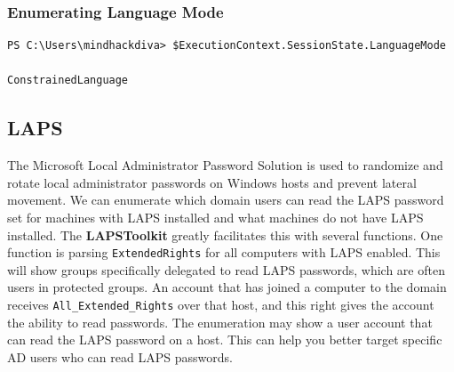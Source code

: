 \subsubsection{Enumerating Language Mode}
\begin{notebox}
\begin{verbatim}
PS C:\Users\mindhackdiva> $ExecutionContext.SessionState.LanguageMode

ConstrainedLanguage
\end{verbatim}
\end{notebox}

\subsection{LAPS}
The Microsoft Local Administrator Password Solution is used to randomize and rotate local administrator passwords on Windows hosts and prevent lateral movement. We can enumerate which domain users can read the LAPS password set for machines with LAPS installed and what machines do not have LAPS installed. The \textbf{LAPSToolkit} greatly facilitates this with several functions. One function is parsing \texttt{ExtendedRights} for all computers with LAPS enabled. This will show groups specifically delegated to read LAPS passwords, which are often users in protected groups. An account that has joined a computer to the domain receives \texttt{All_Extended_Rights} over that host, and this right gives the account the ability to read passwords. The enumeration may show a user account that can read the LAPS password on a host. This can help you better target specific AD users who can read LAPS passwords.

